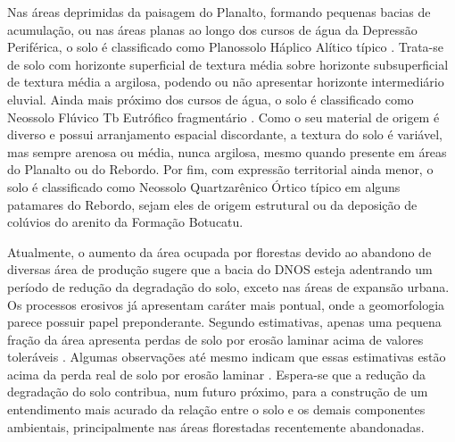 Nas áreas deprimidas da paisagem do Planalto, formando pequenas bacias de acumulação, ou nas áreas planas ao 
longo dos cursos de água da Depressão Periférica, o solo é classificado como Planossolo Háplico Alítico típico 
\cite{Miguel2010}. Trata-se de solo com horizonte superficial de textura média sobre horizonte subsuperficial 
de textura média a argilosa, podendo ou não apresentar horizonte intermediário eluvial. Ainda mais próximo dos 
cursos de água, o solo é classificado como Neossolo Flúvico Tb Eutrófico fragmentário \cite{Miguel2010}. Como 
o seu material de origem é diverso e possui arranjamento espacial discordante, a textura do solo é variável, 
mas sempre arenosa ou média, nunca argilosa, mesmo quando presente em áreas do Planalto ou do Rebordo. Por 
fim, com expressão territorial ainda menor, o solo é classificado como Neossolo Quartzarênico Órtico típico em 
alguns patamares do Rebordo, sejam eles de origem estrutural ou da deposição de colúvios do arenito da 
Formação Botucatu.

Atualmente, o aumento da área ocupada por florestas devido ao abandono de diversas área de produção sugere que 
a bacia do DNOS esteja adentrando um período de redução da degradação do solo, exceto nas áreas de expansão 
urbana. Os processos erosivos já apresentam caráter mais pontual, onde a geomorfologia parece possuir papel 
preponderante. Segundo estimativas, apenas uma pequena fração da área apresenta perdas de solo por erosão 
laminar acima de valores toleráveis \cite{Miguel2010}. Algumas observações até mesmo indicam que essas 
estimativas estão acima da perda real de solo por erosão laminar \cite{MouraBueno2012}. Espera-se que a 
redução da degradação do solo contribua, num futuro próximo, para a construção de um entendimento mais acurado 
da relação entre o solo e os demais componentes ambientais, principalmente nas áreas florestadas recentemente 
abandonadas.
